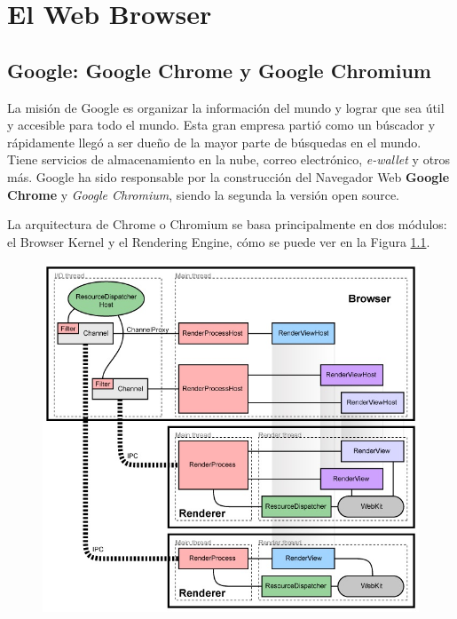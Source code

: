 \chapter{El Web Browser} %
\label{chap:chap3}


\section{Google: Google Chrome y Google Chromium}
La misión de Google es organizar la información del mundo y lograr que sea útil y accesible para todo el mundo. Esta gran empresa partió como un búscador y rápidamente llegó a ser dueño de la mayor parte de búsquedas en el mundo. Tiene servicios de almacenamiento en la nube, correo electrónico, \textit{e-wallet} y otros más. Google ha sido responsable por la construcción del Navegador Web \textbf{Google Chrome} y \textit{Google Chromium}, siendo la segunda la versión open source.

La arquitectura de Chrome o Chromium se basa principalmente en dos módulos: el Browser Kernel y el Rendering Engine, cómo se puede ver en la Figura \ref{fig:archG}.

\begin{figure}[h!t]
    \begin{center}
        \includegraphics[scale=0.5]{figures/archGC.jpg}
      \label{fig:archG}
    \end{center}
\end{figure}


